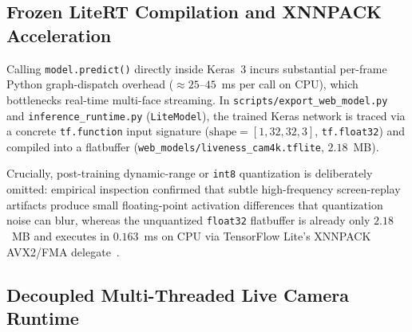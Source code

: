 \subsection{Frozen LiteRT Compilation and XNNPACK Acceleration}

Calling \texttt{model.predict()} directly inside Keras~3 incurs substantial per-frame Python graph-dispatch overhead ($\approx 25$--$45$~ms per call on CPU), which bottlenecks real-time multi-face streaming. In \texttt{scripts/export\_web\_model.py} and \texttt{inference\_runtime.py} (\texttt{LiteModel}), the trained Keras network is traced via a concrete \texttt{tf.function} input signature ($\text{shape}=[1, 32, 32, 3]$, \texttt{tf.float32}) and compiled into a flatbuffer (\texttt{web\_models/liveness\_cam4k.tflite}, $2.18$~MB).

Crucially, post-training dynamic-range or \texttt{int8} quantization is deliberately omitted: empirical inspection confirmed that subtle high-frequency screen-replay artifacts produce small floating-point activation differences that quantization noise can blur, whereas the unquantized \texttt{float32} flatbuffer is already only $2.18$~MB and executes in $0.163$~ms on CPU via TensorFlow Lite's XNNPACK AVX2/FMA delegate~\cite{david2021tensorflow}.

\subsection{Decoupled Multi-Threaded Live Camera Runtime}

